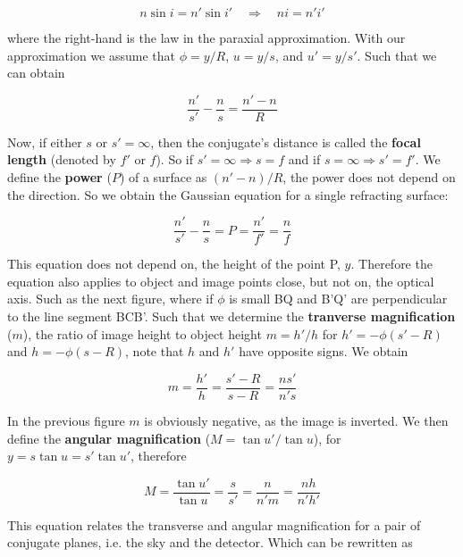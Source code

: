 \documentclass[a4paper]{article}
\begin{document}
\begin{equation}
    n\sin i = n'\sin i'\quad\Rightarrow\quad ni = n'i' 
\end{equation}

where the right-hand is the law in the paraxial approximation. With our approximation we assume that $\phi=y/R$, $u=y/s$, and $u'=y/s'$. Such that we can obtain

\begin{equation}
    \frac{n'}{s'}-\frac{n}{s}=\frac{n'-n}{R}
\end{equation}

Now, if either $s$ or $s'=\infty$, then the conjugate's distance is called the \textbf{focal length} (denoted by $f'$ or $f$). So if $s'=\infty\Rightarrow s=f$ and if $s=\infty\Rightarrow s'=f'$. We define the \textbf{power} ($P$) of a surface as $(n'-n)/R$, the power does not depend on the direction. So we obtain the Gaussian equation for a single refracting surface:

\begin{equation}
    \frac{n'}{s'}-\frac{n}{s}=P=\frac{n'}{f'}=\frac{n}{f}
\end{equation}

This equation does not depend on, the height of the point P, $y$. Therefore the equation also applies to object and image points close, but not on, the optical axis. Such as the next figure, where if $\phi$ is small BQ and B'Q' are perpendicular to the line segment BCB'. Such that we determine the \textbf{tranverse magnification} ($m$), the ratio of image height to object height $m=h'/h$ for $h'=-\phi(s'-R)$ and $h=-\phi(s-R)$, note that $h$ and $h'$ have opposite signs. We obtain

\begin{equation}
    m=\frac{h'}{h}=\frac{s'-R}{s-R}=\frac{ns'}{n's}
\end{equation}

In the previous figure $m$ is obviously negative, as the image is inverted. We then define the \textbf{angular magnification} ($M=\tan u'/\tan u$), for $y=s\tan u=s'\tan u'$, therefore 

\begin{equation}
    M=\frac{\tan u'}{\tan u}=\frac{s}{s'}=\frac{n}{n'm}=\frac{nh}{n'h'}
\end{equation}

This equation relates the transverse and angular magnification for a pair of conjugate planes, i.e. the sky and the detector. Which can be rewritten as
\end{document}
